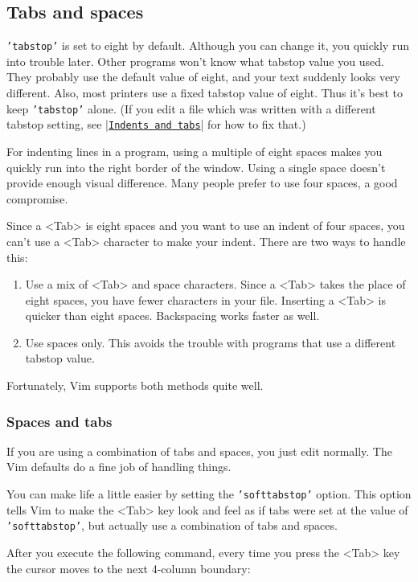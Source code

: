 \subsection{Tabs and spaces}
\texttt{'tabstop'} is set to eight by default.
Although you can change it, you quickly run into trouble later.
Other programs won't know what tabstop value you used.
They probably use the default value of eight, and your text suddenly looks very different.
Also, most printers use a fixed tabstop value of eight.
Thus it's best to keep \texttt{'tabstop'} alone.
(If you edit a file which was written with a different tabstop setting, see |\hyperref[Indents and tabs]{\texttt{Indents and tabs}}| for how to fix that.)

For indenting lines in a program, using a multiple of eight spaces makes you quickly run into the right border of the window.
Using a single space doesn't provide enough visual difference.
Many people prefer to use four spaces, a good compromise.

Since a <Tab> is eight spaces and you want to use an indent of four spaces, you can't use a <Tab> character to make your indent.
There are two ways to handle this:

\begin{enumerate}
				\item Use a mix of <Tab> and space characters.
								Since a <Tab> takes the place of eight spaces, you have fewer characters in your file.
								Inserting a <Tab> is quicker than eight spaces.
								Backspacing works faster as well.
				\item Use spaces only.
								This avoids the trouble with programs that use a different tabstop value.
\end{enumerate}

Fortunately, Vim supports both methods quite well.
\subsubsection{Spaces and tabs}
If you are using a combination of tabs and spaces, you just edit normally.
The Vim defaults do a fine job of handling things.

You can make life a little easier by setting the \texttt{'softtabstop'} option.
This option tells Vim to make the <Tab> key look and feel as if tabs were set at the value of \texttt{'softtabstop'}, but actually use a combination of tabs and spaces.

After you execute the following command, every time you press the <Tab> key the cursor moves to the next 4-column boundary:


